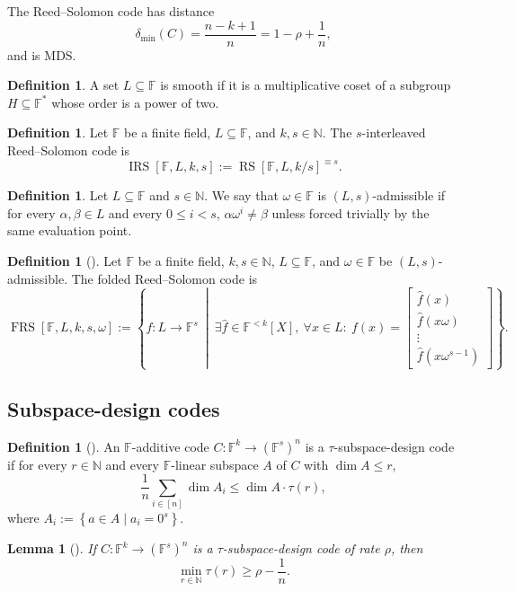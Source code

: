 \documentclass[11pt]{article}
\theoremstyle{plain}
\newtheorem{lemma}[theorem]{Lemma}
\theoremstyle{definition}
\newtheorem{definition}[theorem]{Definition}
\newcommand{\F}{\mathbb{F}}
\newcommand{\N}{\mathbb{N}}
\newcommand{\RS}[3]{\operatorname{RS}[#1,#2,#3]}
\newcommand{\IRS}[4]{\operatorname{IRS}[#1,#2,#3,#4]}
\newcommand{\FRS}[5]{\operatorname{FRS}[#1,#2,#3,#4,#5]}
\newcommand{\distmin}{\delta_{\min}}
\newcommand{\set}[1]{\left\{#1\right\}}
\begin{document}
The Reed--Solomon code has distance
\[
  \distmin(C)=\frac{n-k+1}{n}=1-\rho+\frac1n,
\]
and is MDS.

\begin{definition}
A set $L\subseteq\F$ is smooth if it is a multiplicative coset of a subgroup $H\subseteq\F^*$ whose order is a power of two.
\end{definition}

\begin{definition}
Let $\F$ be a finite field, $L\subseteq\F$, and $k,s\in\N$. The $s$-interleaved Reed--Solomon code is
\[
  \IRS{\F}{L}{k}{s}:=\RS{\F}{L}{k/s}^{\equiv s}.
\]
\end{definition}

\begin{definition}
Let $L\subseteq\F$ and $s\in\N$. We say that $\omega\in\F$ is $(L,s)$-admissible if for every $\alpha,\beta\in L$ and every $0\le i<s$, $\alpha\omega^i\ne\beta$ unless forced trivially by the same evaluation point.
\end{definition}

\begin{definition}[\cite{GR08}]
Let $\F$ be a finite field, $k,s\in\N$, $L\subseteq\F$, and $\omega\in\F$ be $(L,s)$-admissible. The folded Reed--Solomon code is
\[
\FRS{\F}{L}{k}{s}{\omega}:=
\left\{ f:L\to\F^s\ \middle|\
\exists\hat f\in\F^{<k}[X],\ \forall x\in L:\
 f(x)=\begin{bmatrix}
 \hat f(x)\\
 \hat f(x\omega)\\
 \vdots\\
 \hat f(x\omega^{s-1})
 \end{bmatrix}
\right\}.
\]
\end{definition}

\subsection{Subspace-design codes}

\begin{definition}[\cite{GX13}]
An $\F$-additive code $C:\F^k\to(\F^s)^n$ is a $\tau$-subspace-design code if for every $r\in\N$ and every $\F$-linear subspace $A$ of $C$ with $\dim A\le r$,
\[
  \frac{1}{n}\sum_{i\in[n]} \dim A_i \le \dim A\cdot \tau(r),
\]
where $A_i:=\set{a\in A\mid a_i=0^s}$.
\end{definition}

\begin{lemma}[\cite{GG25}]
If $C:\F^k\to(\F^s)^n$ is a $\tau$-subspace-design code of rate $\rho$, then
\[
  \min_{r\in\N}\tau(r)\ge \rho-\frac1n.
\]
\end{lemma}
\end{document}
